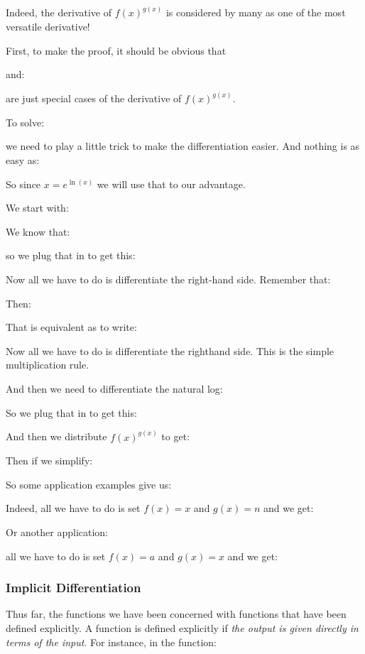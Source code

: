 \begin{enumerate}
			Indeed, the derivative of $f(x)^{g(x)}$ is considered by many as one of the most versatile derivative!
			
			First, to make the proof, it should be obvious that
			
			and:
			
		 	are just special cases of the derivative of $f(x)^{g(x)}$.
		 	
		 	To solve:
		 	
			 we need to play a little trick to make the differentiation easier. And nothing is as easy as:
			 
			So since $x = e^{\ln(x)}$ we will use that to our advantage.
			
			We start with:
			
			We know that:
			
			so we plug that in to get this:
			
			Now all we have to do is differentiate the right-hand side. 
		Remember that:
			
			Then:
			
			That is equivalent as to write:
			
		   Now all we have to do is differentiate the righthand side. This is the simple multiplication rule.
			
			And then we need to differentiate the natural log:
			
		  	So we plug that in to get this:
			
			And then we distribute $f(x)^{g(x)}$ to get:
			
			Then if we simplify:
			
			So some application examples give us:
			
		   	Indeed, all we have to do is set $f(x) = x$ and $g(x) = n$ and we get:
		   	
			Or another application:
			
		   all we have to do is set $f(x) = a$ and $g(x) = x$ and we get:
			
		 \end{enumerate}
		 
		 \pagebreak
		\subsubsection{Implicit Differentiation}
	Thus far, the functions we have been concerned with functions that have been defined explicitly. A function is defined explicitly if {\it the output is given directly in terms of the input}. For instance, in the function:
		
